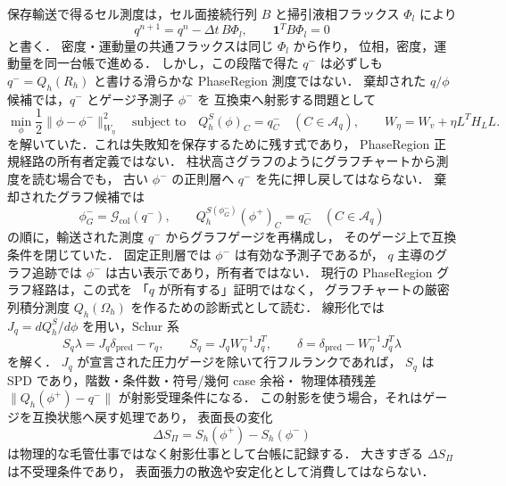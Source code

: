 保存輸送で得るセル測度は，セル面接続行列 $B$ と掃引液相フラックス $\Phi_l$ により
\begin{equation}
  q^{n+1}=q^n-\Delta t\,B\Phi_l,
  \qquad
  \mathbf{1}^T B\Phi_l=0
  \label{eq:ao_conservative_q_update}
\end{equation}
と書く．
密度・運動量の共通フラックスは同じ $\Phi_l$ から作り，
位相，密度，運動量を同一台帳で進める．
しかし，この段階で得た $q^-$ は必ずしも
$q^-=Q_h(R_h)$ と書ける滑らかな PhaseRegion 測度ではない．
棄却された $q/\phi$ 候補では，$q^-$ とゲージ予測子 $\phi^-$ を
互換束へ射影する問題として
\begin{equation}
  \min_{\phi}\frac12\|\phi-\phi^-\|_{W_\eta}^2
  \quad\text{subject to}\quad
  Q_h^S(\phi)_C=q^-_C\quad(C\in\mathcal{A}_q),
  \qquad
  W_\eta=W_v+\eta L^T H_L L .
  \label{eq:ao_projection_problem}
\end{equation}
を解いていた．これは失敗知を保存するために残す式であり，
PhaseRegion 正規経路の所有者定義ではない．
柱状高さグラフのようにグラフチャートから測度を読む場合でも，
古い $\phi^-$ の正則層へ $q^-$ を先に押し戻してはならない．
棄却されたグラフ候補では
\begin{equation}
  \phi_G^-=\mathcal{G}_{\mathrm{col}}(q^-),
  \qquad
  Q_h^{S(\phi_G^-)}(\phi^+)_C=q^-_C
  \quad(C\in\mathcal{A}_q)
  \label{eq:ao_q_owned_graph_gauge}
\end{equation}
の順に，輸送された測度 $q^-$ からグラフゲージを再構成し，
そのゲージ上で互換条件を閉じていた．
固定正則層では $\phi^-$ は有効な予測子であるが，
$q$ 主導のグラフ追跡では $\phi^-$ は古い表示であり，所有者ではない．
現行の PhaseRegion グラフ経路は，この式を
「$q$ が所有する」証明ではなく，
グラフチャートの厳密列積分測度
$Q_h(\Omega_h)$ を作るための診断式として読む．
線形化では $J_q=dQ_h^S/d\phi$ を用い，Schur 系
\begin{equation}
  S_q\lambda=J_q\delta_{\mathrm{pred}}-r_q,
  \qquad
  S_q=J_qW_\eta^{-1}J_q^T,
  \qquad
  \delta=\delta_{\mathrm{pred}}-W_\eta^{-1}J_q^T\lambda
  \label{eq:ao_projection_schur}
\end{equation}
を解く．
$J_q$ が宣言された圧力ゲージを除いて行フルランクであれば，
$S_q$ は SPD であり，階数・条件数・符号/幾何 case 余裕・
物理体積残差 $\|Q_h(\phi^+)-q^-\|$ が射影受理条件になる．
この射影を使う場合，それはゲージを互換状態へ戻す処理であり，
表面長の変化
\begin{equation}
  \Delta S_\Pi=S_h(\phi^+)-S_h(\phi^-)
  \label{eq:ao_projection_surface_work}
\end{equation}
は物理的な毛管仕事ではなく射影仕事として台帳に記録する．
大きすぎる $\Delta S_\Pi$ は不受理条件であり，
表面張力の散逸や安定化として消費してはならない．

